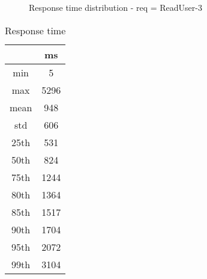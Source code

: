 \begin{minipage}{0.75\linewidth}
\begin{figure}[h]
\begin{adjustbox}{max width=1.0\linewidth, keepaspectratio}
  \end{adjustbox}
  \caption{Response time distribution - req = ReadUser-3}
\end{figure}
\end{minipage}\hfill\begin{minipage}{0.18\linewidth}
\begin{table}[h]
\begin{tabular}{|cc|}
\hline
\textbf{} & \textbf{ms}\\ \hline
 \Xhline{0.005\arrayrulewidth}
min & 5\\
 \Xhline{0.005\arrayrulewidth}
max & 5296\\
 \Xhline{0.005\arrayrulewidth}
mean & 948\\
 \Xhline{0.005\arrayrulewidth}
std & 606\\
\hline
\hline
 \Xhline{0.005\arrayrulewidth}
25th & 531\\
 \Xhline{0.005\arrayrulewidth}
50th & 824\\
 \Xhline{0.005\arrayrulewidth}
75th & 1244\\
 \Xhline{0.005\arrayrulewidth}
80th & 1364\\
 \Xhline{0.005\arrayrulewidth}
85th & 1517\\
 \Xhline{0.005\arrayrulewidth}
90th & 1704\\
 \Xhline{0.005\arrayrulewidth}
95th & 2072\\
 \Xhline{0.005\arrayrulewidth}
99th & 3104\\
\hline
\end{tabular}
\caption{Response time}
\end{table}
\end{minipage}\hfill